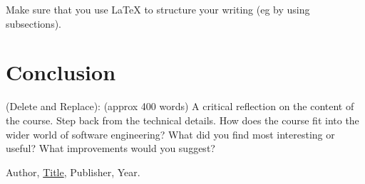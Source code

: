 \documentclass{article}
\theoremstyle{theorem}
\theoremstyle{definition}
\theoremstyle{remark}
\begin{document}
Make sure that you use \LaTeX{} to structure your writing (eg by using subsections).

\section{Conclusion}\label{conclusion}

(Delete and Replace): (approx 400 words) A critical reflection on the content of the course. Step back from the technical details. How does the course fit into the wider world of software engineering? What did you find most interesting or useful? What improvements would you suggest?

\begin{thebibliography}{99}
 Author, \href{https://en.wikipedia.org/wiki/LaTeX}{Title}, Publisher, Year.
\end{thebibliography}
\end{document}
